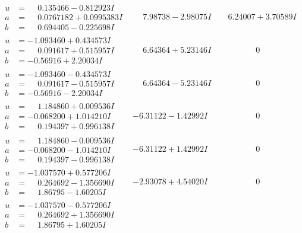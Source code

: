 \documentclass[1p]{elsarticle_modified}
\theoremstyle{definition}
\begin{document}
$$\begin{array}{c|c|c}
\begin{aligned}
u &= \phantom{-}0.135466 - 0.812923 I \\
a &= \phantom{-}0.0767182 + 0.0995383 I \\
b &= \phantom{-}0.694405 - 0.225698 I\end{aligned}
 & \phantom{-}7.98738 - 2.98075 I & \phantom{-}6.24007 + 3.70589 I \\ \hline\begin{aligned}
u &= -1.093460 + 0.434573 I \\
a &= \phantom{-}0.091617 + 0.515957 I \\
b &= -0.56916 + 2.20034 I\end{aligned}
 & \phantom{-}6.64364 + 5.23146 I & \phantom{-0.000000 } 0 \\ \hline\begin{aligned}
u &= -1.093460 - 0.434573 I \\
a &= \phantom{-}0.091617 - 0.515957 I \\
b &= -0.56916 - 2.20034 I\end{aligned}
 & \phantom{-}6.64364 - 5.23146 I & \phantom{-0.000000 } 0 \\ \hline\begin{aligned}
u &= \phantom{-}1.184860 + 0.009536 I \\
a &= -0.068200 + 1.014210 I \\
b &= \phantom{-}0.194397 + 0.996138 I\end{aligned}
 & -6.31122 - 1.42992 I & \phantom{-0.000000 } 0 \\ \hline\begin{aligned}
u &= \phantom{-}1.184860 - 0.009536 I \\
a &= -0.068200 - 1.014210 I \\
b &= \phantom{-}0.194397 - 0.996138 I\end{aligned}
 & -6.31122 + 1.42992 I & \phantom{-0.000000 } 0 \\ \hline\begin{aligned}
u &= -1.037570 + 0.577206 I \\
a &= \phantom{-}0.264692 - 1.356690 I \\
b &= \phantom{-}1.86795 - 1.60205 I\end{aligned}
 & -2.93078 + 4.54020 I & \phantom{-0.000000 } 0 \\ \hline\begin{aligned}
u &= -1.037570 - 0.577206 I \\
a &= \phantom{-}0.264692 + 1.356690 I \\
b &= \phantom{-}1.86795 + 1.60205 I\end{aligned}

\end{array}$$
\end{document}
